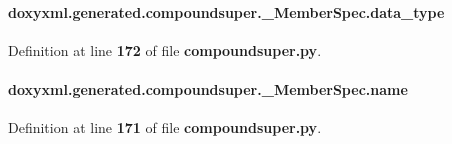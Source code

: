 \paragraph[{data\+\_\+type}]{\setlength{\rightskip}{0pt plus 5cm}doxyxml.\+generated.\+compoundsuper.\+\_\+\+Member\+Spec.\+data\+\_\+type}\label{classdoxyxml_1_1generated_1_1compoundsuper_1_1__MemberSpec_a9520c751602df6558ff874e726227ffd}


Definition at line {\bf 172} of file {\bf compoundsuper.\+py}.

\paragraph[{name}]{\setlength{\rightskip}{0pt plus 5cm}doxyxml.\+generated.\+compoundsuper.\+\_\+\+Member\+Spec.\+name}\label{classdoxyxml_1_1generated_1_1compoundsuper_1_1__MemberSpec_a48b6c38ec9ffc4326e09d84e49b1cef3}


Definition at line {\bf 171} of file {\bf compoundsuper.\+py}.



